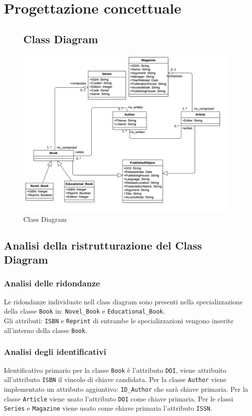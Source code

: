 \chapter{Progettazione concettuale}

\begin{figure}[hbt]
\section{Class Diagram}
\centering
\includegraphics[width=1.1\textwidth]{Immagini/ClassDiagram.png}
\caption{Class Diagram}
\label{fig:ClassDiagram}
\end{figure}

\section{Analisi della ristrutturazione del Class Diagram}

\subsection{Analisi delle ridondanze}

Le ridondanze individuate nell class diagram sono presenti nella specializzazione della classe \texttt{Book} in: \texttt{Novel\_Book} e \texttt{Educational\_Book}. \\ 
Gli attributi: \texttt{ISBN} e \texttt{Reprint} di entrambe le specializzazioni vengono inserite all'interno della classe \texttt{Book}.

\subsection{Analisi degli identificativi}
Identificativo primario per la classe \texttt{Book} è l'attributo \texttt{DOI}, viene attribuito all'attributo \texttt{ISBN} il vincolo di chiave candidata. 
Per la classe \texttt{Author} viene implementato un attributo aggiuntivo: \texttt{ID\_Author} che sarà chiave primaria.
Per la classe \texttt{Article} viene usato l'attributo \texttt{DOI} come chiave primaria.
Per le classi \texttt{Series} e \texttt{Magazine} viene usato come chiave primaria l'attributo \texttt{ISSN}.

